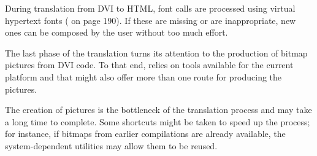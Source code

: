 During translation from DVI to HTML, font calls are processed using
virtual hypertext fonts ( on page 190). If these are
missing or are inappropriate, new ones can be composed by the user
without too much effort. 


The last phase of the translation turns its attention to the production
of bitmap pictures from DVI code. To that end, \texht relies on tools
available for the current platform and that might also offer more than
one route for producing the pictures. 

The creation of pictures is the bottleneck of the translation process
and may take a long time to complete. Some shortcuts might be taken to
speed up the process; for instance, if bitmaps from earlier compilations
are already available, the system-dependent utilities may allow them to
be reused. 
